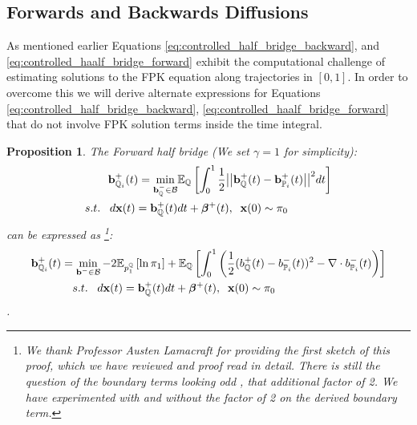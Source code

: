 \documentclass[a4paper,12pt,twoside,openright]{report}
\newtheorem{proposition}{Proposition}
\theoremstyle{definition}
\begin{document}
\subsection{Forwards and Backwards Diffusions}

As mentioned earlier Equations \ref{eq:controlled_half_bridge_backward}, and \ref{eq:controlled_haalf_bridge_forward} exhibit the computational challenge of estimating solutions to the FPK equation along trajectories in $[0,1]$.  In order to overcome this we will derive alternate expressions for Equations \ref{eq:controlled_half_bridge_backward},  \ref{eq:controlled_haalf_bridge_forward} that do not involve FPK solution terms inside the time integral.
\begin{proposition}\label{prop:halfforcontrol}
The Forward half bridge (We set $\gamma=1$  for simplicity):
\begin{align*} 
   {\mathbf{b}}^{+}_{{\mathbb{Q}}_{i}}(t) =\min_{{\mathbf{b}}_{\mathbb{Q}}^{-} \in {\mathcal{B}} } & \mathbb{E}_{\mathbb{Q}}\left[\int_0^1 \frac{1}{2}\big|\big|{\mathbf{b}}_{\mathbb{Q}}^{+}(t) -{\mathbf{b}}^{+}_{{\mathbb{P}}_{i}}(t)\big|\big|^2 dt\right] \nonumber \\
    s.t.\;\;\; d{\mathbf{x}}(t) = {\mathbf{b}}_{\mathbb{Q}}^{+}(t) &dt +  {\bm{\beta}}^{+}(t), \;\; {\mathbf{x}}(0) \sim \pi_0
\end{align*}
can be expressed as \footnote{We thank Professor Austen Lamacraft for providing the first sketch of this proof, which we have reviewed and proof read in detail. There is still the question of the boundary terms looking odd , that additional factor of 2. We have experimented with and without the factor of 2 on the derived boundary term.}:
\begin{align} \label{eq:div_control_forward}
   {\mathbf{b}}^{+}_{{\mathbb{Q}}_{i}}(t) =\min_{{\mathbf{b}}^{-} \in {\mathcal{B}} } -2\mathbb{E}_{p^{{\mathbb{Q}}}_1}\left[\operatorname{ln} \pi_1 \right] &+ \mathbb{E}_{{\mathbb{Q}}}\left[\int_0^1 \left(\frac{1}{2}(b_{\mathbb{Q}}^{+}(t) - b_{{\mathbb{P}}_{i}}^{-}(t))^2 - \nabla\cdot b^{-}_{{\mathbb{P}}_{i}}(t) \right)\right] \nonumber \\
    s.t.\;\;\; d{\mathbf{x}}(t) = {\mathbf{b}}_{\mathbb{Q}}^{+}(t) &dt + {\bm{\beta}}^{+}(t), \;\; {\mathbf{x}}(0) \sim \pi_0
\end{align}.
\end{proposition}
\end{document}
